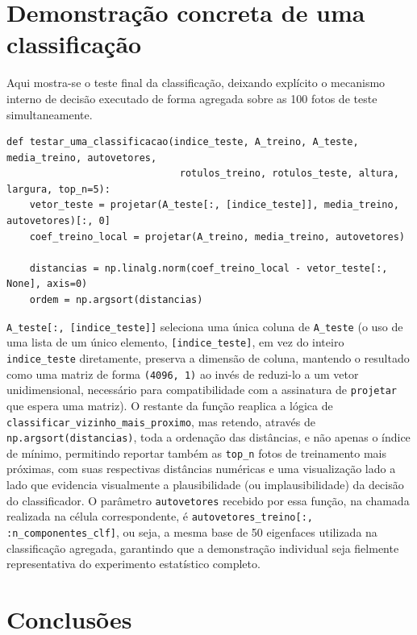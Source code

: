 \documentclass[12pt,a4paper]{article}
\begin{document}
\section{Demonstração concreta de uma classificação}

Aqui mostra-se o teste final da classificação, deixando explícito o mecanismo interno de decisão executado de forma agregada sobre as 100 fotos de teste simultaneamente.

\begin{lstlisting}
def testar_uma_classificacao(indice_teste, A_treino, A_teste, media_treino, autovetores,
                              rotulos_treino, rotulos_teste, altura, largura, top_n=5):
    vetor_teste = projetar(A_teste[:, [indice_teste]], media_treino, autovetores)[:, 0]
    coef_treino_local = projetar(A_treino, media_treino, autovetores)

    distancias = np.linalg.norm(coef_treino_local - vetor_teste[:, None], axis=0)
    ordem = np.argsort(distancias)
\end{lstlisting}

\texttt{A\_teste[:, [indice\_teste]]} seleciona uma única coluna de \texttt{A\_teste} (o uso de uma
lista de um único elemento, \texttt{[indice\_teste]}, em vez do inteiro \texttt{indice\_teste}
diretamente, preserva a dimensão de coluna, mantendo o resultado como uma matriz de
forma \texttt{(4096, 1)} ao invés de reduzi-lo a um vetor unidimensional, necessário para
compatibilidade com a assinatura de \texttt{projetar} que espera uma matriz). O restante da
função reaplica a lógica de \texttt{classificar\_vizinho\_mais\_proximo}, mas
retendo, através de \texttt{np.argsort(distancias)}, toda a ordenação das distâncias, e
não apenas o índice de mínimo, permitindo reportar também
as \texttt{top\_n} fotos de treinamento mais próximas, com suas respectivas distâncias
numéricas e uma visualização lado a lado que evidencia visualmente a
plausibilidade (ou implausibilidade) da decisão do classificador. O parâmetro
\texttt{autovetores} recebido por essa função, na chamada realizada na célula
correspondente, é \texttt{autovetores\_treino[:, :n\_componentes\_clf]}, ou seja, a mesma
base de 50 eigenfaces utilizada na classificação agregada, garantindo
que a demonstração individual seja fielmente representativa do experimento
estatístico completo.

\section{Conclusões}
\end{document}
